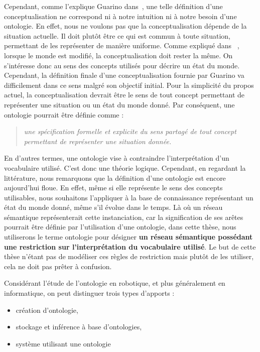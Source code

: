 Cependant, comme l'explique Guarino dans~\cite{guarino_2009_ontology}, une telle définition d'une conceptualisation ne correspond ni à notre intuition ni à notre besoin d'une ontologie. En effet, nous ne voulons pas que la conceptualisation dépende de la situation actuelle. Il doit plutôt être ce qui est commun à toute situation, permettant de les représenter de manière uniforme. Comme expliqué dans ~\cite{guarino_1995_towards}, lorsque le monde est modifié, la conceptualisation doit rester la même. On s'intéresse donc au sens des concepts utilisés pour décrire un état du monde. Cependant, la définition finale d'une conceptualisation fournie par Guarino va difficilement dans ce sens malgré son objectif initial. Pour la simplicité du propos actuel, la conceptualisation devrait être le sens de tout concept permettant de représenter une situation ou un état du monde donné. Par conséquent, une ontologie pourrait être définie comme :

\begin{quote} 
\centering 
\textit{une spécification formelle et explicite du sens partagé de tout concept permettant de représenter une situation donnée.}
\end{quote}

En d'autres termes, une ontologie vise à contraindre l'interprétation d'un vocabulaire utilisé. C'est donc une théorie logique. Cependant, en regardant la littérature, nous remarquons que la définition d'une ontologie est encore aujourd'hui floue. En effet, même si elle représente le sens des concepts utilisables, nous souhaitons l'appliquer à la base de connaissance représentant un état du monde donné, même s'il évolue dans le temps. Là où un réseau sémantique représenterait cette instanciation, car la signification de ses arêtes pourrait être définie par l'utilisation d'une ontologie, dans cette thèse, nous utiliserons le terme ontologie pour désigner \textbf{un réseau sémantique possédant une restriction sur l'interprétation du vocabulaire utilisé}. Le but de cette thèse n'étant pas de modéliser ces règles de restriction mais plutôt de les utiliser, cela ne doit pas prêter à confusion. 

Considérant l'étude de l'ontologie en robotique, et plus généralement en informatique, on peut distinguer trois types d'apports :

\begin{itemize}
   \item création d'ontologie,
   \item stockage et inférence à base d'ontologies,
   \item système utilisant une ontologie
\end{itemize}

